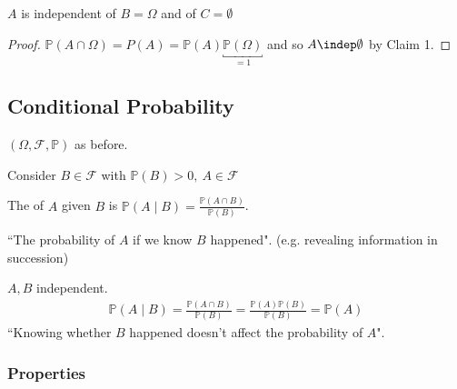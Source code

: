 \begin{claim}
    $A$ is independent of $B = \Omega$ and of $C = \emptyset$
\end{claim} 

\begin{proof}
    $\mathbb{P}(A \cap \Omega) = P(A) = \mathbb{P}(A) \underbracket{\mathbb{P}(\Omega)}_{= 1}$ and so $A \indep \emptyset$ by Claim 1.
\end{proof} 

\subsection{Conditional Probability}
$(\Omega, \mathcal{F}, \mathbb{P})$ as before.

Consider $B \in \mathcal{F}$ with $\mathbb{P}(B) > 0,\ A \in \mathcal{F}$

\begin{definition} \label{def:condition}
    The  of $A$ given $B$ is $\mathbb{P}(A \mid B) = \frac{\mathbb{P}(A \cap B)}{\mathbb{P}(B)}$.
\end{definition} 
\color{blue} ``The probability of $A$ if we know $B$ happened". (e.g. revealing information in succession)

\begin{example}
    $A, B$ independent.
    \begin{align*}
        \mathbb{P}(A \mid B) = \frac{\mathbb{P}(A \cap B)}{\mathbb{P}(B)} = \frac{\mathbb{P}(A) \mathbb{P}(B)}{\mathbb{P}(B)} = \mathbb{P}(A)
    \end{align*} 
    \color{blue}``Knowing whether $B$ happened doesn't affect the probability of $A$".
\end{example} 
\color{black}

\subsubsection{Properties}

